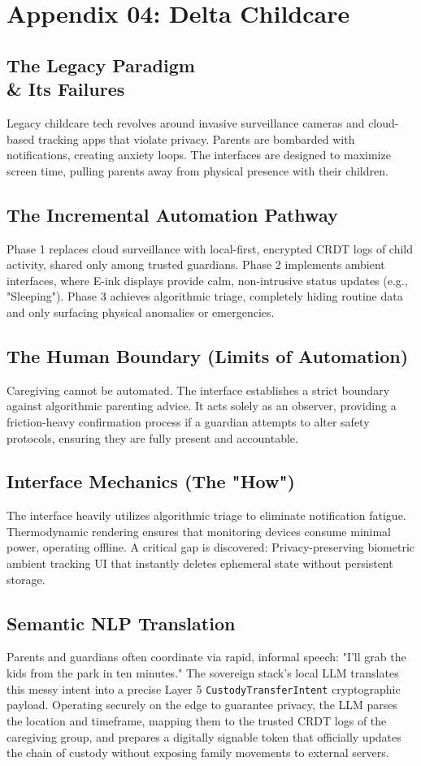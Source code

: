 \chapter{Appendix 04: Delta Childcare}

\section{The Legacy Paradigm \\\& Its Failures}
Legacy childcare tech revolves around invasive surveillance cameras and cloud-based tracking apps that violate privacy. Parents are bombarded with notifications, creating anxiety loops. The interfaces are designed to maximize screen time, pulling parents away from physical presence with their children.

\section{The Incremental Automation Pathway}
Phase 1 replaces cloud surveillance with local-first, encrypted CRDT logs of child activity, shared only among trusted guardians. Phase 2 implements ambient interfaces, where E-ink displays provide calm, non-intrusive status updates (e.g., "Sleeping"). Phase 3 achieves algorithmic triage, completely hiding routine data and only surfacing physical anomalies or emergencies.

\section{The Human Boundary (Limits of Automation)}
Caregiving cannot be automated. The interface establishes a strict boundary against algorithmic parenting advice. It acts solely as an observer, providing a friction-heavy confirmation process if a guardian attempts to alter safety protocols, ensuring they are fully present and accountable.

\section{Interface Mechanics (The "How")}
The interface heavily utilizes algorithmic triage to eliminate notification fatigue. Thermodynamic rendering ensures that monitoring devices consume minimal power, operating offline. A critical gap is discovered: Privacy-preserving biometric ambient tracking UI that instantly deletes ephemeral state without persistent storage.

\section{Semantic NLP Translation}
Parents and guardians often coordinate via rapid, informal speech: "I'll grab the kids from the park in ten minutes." The sovereign stack's local LLM translates this messy intent into a precise Layer 5 \texttt{CustodyTransferIntent} cryptographic payload. Operating securely on the edge to guarantee privacy, the LLM parses the location and timeframe, mapping them to the trusted CRDT logs of the caregiving group, and prepares a digitally signable token that officially updates the chain of custody without exposing family movements to external servers.
